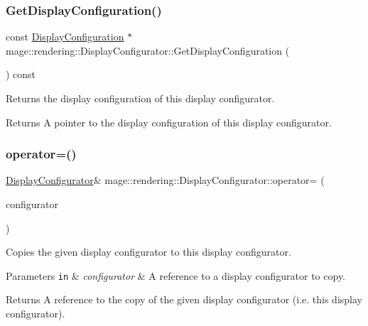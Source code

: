 \subsubsection{\texorpdfstring{Get\+Display\+Configuration()}{GetDisplayConfiguration()}}
{\footnotesize\ttfamily const \mbox{\hyperlink{classmage_1_1rendering_1_1_display_configuration}{Display\+Configuration}} $\ast$ mage\+::rendering\+::\+Display\+Configurator\+::\+Get\+Display\+Configuration (\begin{DoxyParamCaption}{ }\end{DoxyParamCaption}) const\hspace{0.3cm}{\ttfamily [noexcept]}}

Returns the display configuration of this display configurator.

\begin{DoxyReturn}{Returns}
A pointer to the display configuration of this display configurator. 
\end{DoxyReturn}
\mbox{\label{classmage_1_1rendering_1_1_display_configurator_affd6a3486be8564246628a6a20518ac2}} 
\subsubsection{\texorpdfstring{operator=()}{operator=()}\hspace{0.1cm}{\footnotesize\ttfamily [1/2]}}
{\footnotesize\ttfamily \mbox{\hyperlink{classmage_1_1rendering_1_1_display_configurator}{Display\+Configurator}}\& mage\+::rendering\+::\+Display\+Configurator\+::operator= (\begin{DoxyParamCaption}\item[{const \mbox{\hyperlink{classmage_1_1rendering_1_1_display_configurator}{Display\+Configurator}} \&}]{configurator }\end{DoxyParamCaption})\hspace{0.3cm}{\ttfamily [delete]}}

Copies the given display configurator to this display configurator.


\begin{DoxyParams}[1]{Parameters}
\mbox{\tt in}  & {\em configurator} & A reference to a display configurator to copy. \\
\hline
\end{DoxyParams}
\begin{DoxyReturn}{Returns}
A reference to the copy of the given display configurator (i.\+e. this display configurator). 
\end{DoxyReturn}
\mbox{\label{classmage_1_1rendering_1_1_display_configurator_afa750c6d058e2298dd6bb9cf44d54f06}} 
